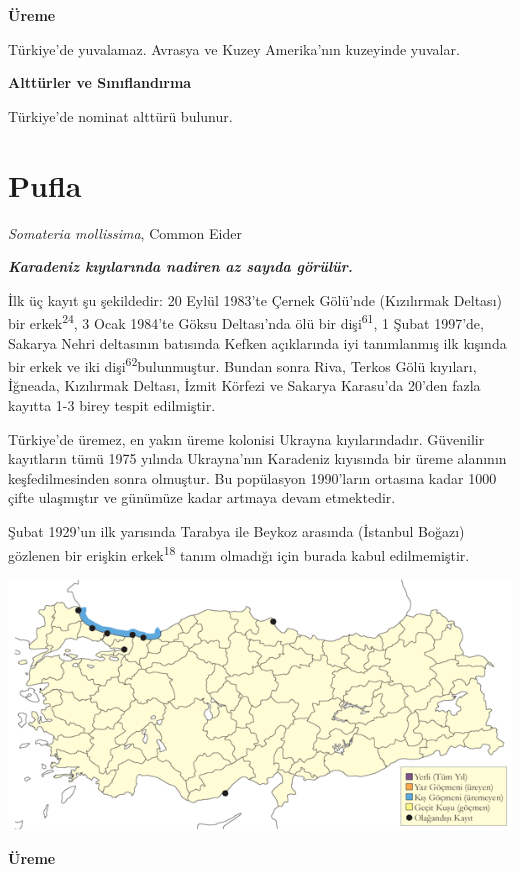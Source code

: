 \documentclass[
  letterpaper,
  DIV=11,
  numbers=noendperiod]{scrreprt}
\begin{document}
\textbf{Üreme}

Türkiye'de yuvalamaz. Avrasya ve Kuzey Amerika'nın kuzeyinde yuvalar.

\textbf{Alttürler ve Sınıflandırma}

Türkiye'de nominat alttürü bulunur.

\section{Pufla}\label{pufla}

\emph{Somateria mollissima}, Common Eider

\textbf{\emph{Karadeniz kıyılarında nadiren az sayıda görülür.}}

İlk üç kayıt şu şekildedir: 20 Eylül 1983'te Çernek Gölü'nde (Kızılırmak
Deltası) bir erkek\textsuperscript{24}, 3 Ocak 1984'te Göksu Deltası'nda
ölü bir dişi\textsuperscript{61}, 1 Şubat 1997'de, Sakarya Nehri
deltasının batısında Kefken açıklarında iyi tanımlanmış ilk kışında bir
erkek ve iki dişi\textsuperscript{62}bulunmuştur. Bundan sonra Riva,
Terkos Gölü kıyıları, İğneada, Kızılırmak Deltası, İzmit Körfezi ve
Sakarya Karasu'da 20'den fazla kayıtta 1-3 birey tespit edilmiştir.

Türkiye'de üremez, en yakın üreme kolonisi Ukrayna kıyılarındadır.
Güvenilir kayıtların tümü 1975 yılında Ukrayna'nın Karadeniz kıyısında
bir üreme alanının keşfedilmesinden sonra olmuştur. Bu popülasyon
1990'ların ortasına kadar 1000 çifte ulaşmıştır ve günümüze kadar
artmaya devam etmektedir.

Şubat 1929'un ilk yarısında Tarabya ile Beykoz arasında (İstanbul
Boğazı) gözlenen bir erişkin erkek\textsuperscript{18} tanım olmadığı
için burada kabul edilmemiştir.

\includegraphics{images/harita_Page_027.png}

\textbf{Üreme}
\end{document}
